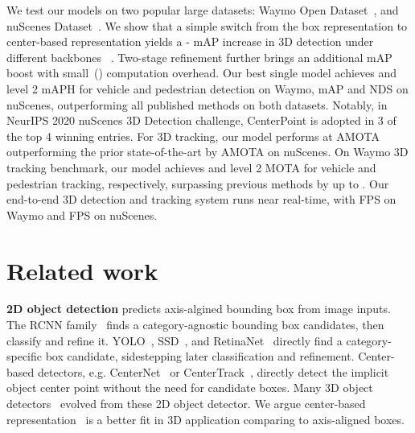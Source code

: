 \documentclass[final]{cvpr}
\begin{document}
We test our models on two popular large datasets: Waymo Open Dataset~\cite{sun2019scalability}, and nuScenes Dataset~\cite{caesar2019nuscenes}. 
We show that a simple switch from the box representation to center-based representation yields a - mAP increase in 3D detection under different backbones ~\cite{pillar, voxelnet, yan2018second, zhu2019classbalanced}. 
Two-stage refinement further brings an additional  mAP boost with small~() computation overhead.
Our best single model achieves  and  level 2 mAPH for vehicle and pedestrian detection on Waymo,  mAP and  NDS on nuScenes, outperforming all published methods on both datasets.   
Notably, in NeurIPS 2020 nuScenes 3D Detection challenge, CenterPoint is adopted in 3 of the top 4 winning entries. 
For 3D tracking, our model performs at  AMOTA outperforming the prior state-of-the-art by  AMOTA on nuScenes. 
On Waymo 3D tracking benchmark, our model achieves  and  level 2 MOTA for vehicle and pedestrian tracking, respectively, surpassing previous methods by up to . 
Our end-to-end 3D detection and tracking system runs near real-time, with  FPS on Waymo and  FPS on nuScenes. 

\section{Related work}
\label{related_work}
\noindent
\textbf{2D object detection} predicts axis-algined bounding box from image inputs.
The RCNN family~\cite{girshick2014rich,girshick2015fast,ren2015faster,he2017mask} finds a category-agnostic bounding box candidates, then classify and refine it.
YOLO~\cite{redmon2017yolo9000}, SSD~\cite{liu2016ssd}, and RetinaNet~\cite{focal2017} directly find a category-specific box candidate, sidestepping later classification and refinement.
Center-based detectors, e.g. CenterNet~\cite{zhou2019objects} or CenterTrack~\cite{zhou2020tracking}, directly detect the implicit object center point without the need for candidate boxes.
Many 3D object detectors~\cite{shi2019pointrcnn,yang20203dssd,simony2018complex, sassd} evolved from these 2D object detector.
We argue center-based representation~\cite{zhou2019objects,zhou2020tracking} is a better fit in 3D application comparing to axis-aligned boxes.
\end{document}
